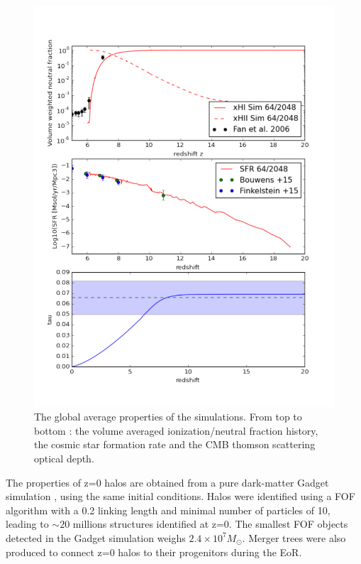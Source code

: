\documentclass[twocolumn]{aastex61}
\begin{document}
\begin{figure}[ht!]
\includegraphics[height=1.10\columnwidth, width=0.94\columnwidth]{img/x_sfr_tau.pdf}
\caption{The global average properties of the simulations. From top to bottom : the volume averaged ionization/neutral fraction history, the cosmic star formation rate and the CMB thomson scattering optical depth.}
\label{fig:globpro}
\end{figure}





The properties of z=0 halos are obtained from a pure dark-matter Gadget simulation \citep{SPR5}, using the same initial conditions. %
Halos were identified using a FOF algorithm with a 0.2 linking length and minimal number of particles of 10, leading to $\sim 20$ millions structures identified at z=0. The smallest FOF objects detected in the Gadget simulation weighs $2.4\times 10^7 M_\odot$. Merger trees were also produced to connect z=0 halos to their progenitors during the EoR. 
\end{document}
